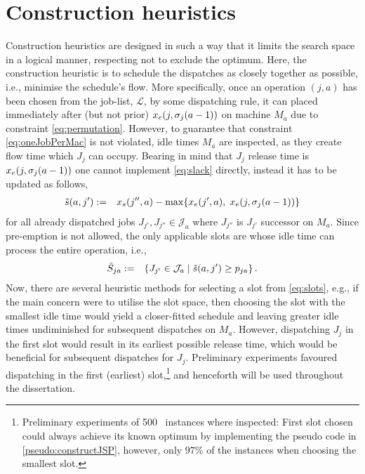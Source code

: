\section{Construction heuristics}\label{sec:CH}
Construction heuristics are designed in such a way that it limits the search space in a logical manner, respecting not to exclude the optimum. Here, the construction heuristic is to schedule the dispatches as closely together as possible, i.e., minimise the schedule's flow. 
More specifically, once an operation $(j,a)$ has been chosen from the job-list, 
$\mathcal{L}$, by some dispatching rule, it can placed immediately after (but 
not prior) $x_e(j,{\mathbf{\sigma}}_j(a-1))$ on machine $M_a$ due to constraint 
\cref{eq:permutation}. 
However, to guarantee that constraint \cref{eq:oneJobPerMac} is not violated, 
idle times $M_a$ are inspected, as they create flow time  which $J_j$ can 
occupy. Bearing in mind that $J_j$ release time is $x_e(j,{\mathbf{\sigma}}_j(a-1))$ one 
cannot implement \cref{eq:slack} directly, instead it has to be updated as 
follows,
\begin{eqnarray}
	\tilde{s}(a,j')&:=& x_s(j'',a)-\max\{x_e(j',a),\;x_e(j,\vsigma_j(a-1))\} %
\end{eqnarray}
for all already dispatched jobs $J_{j'},J_{j''}\in \mathcal{J}_a$ where $J_{j''}$ is $J_{j'}$ successor on $M_a$. Since pre-emption is not allowed, the only applicable slots are whose idle time can process the entire operation, i.e.,
\begin{eqnarray}
	\tilde{S}_{ja}&:=&\condset{J_{j'}\in \mathcal{J}_a}{\tilde{s}(a,j')\geq 
	p_{ja} }\label{eq:slots}.
\end{eqnarray} 
Now, there are several heuristic methods for selecting a slot from 
\cref{eq:slots}, e.g., if the main concern were to utilise the slot space, then 
choosing the slot with the smallest idle time would yield a closer-fitted 
schedule and leaving greater idle times undiminished for subsequent dispatches 
on $M_a$. However, dispatching $J_j$ in the first slot would result in its 
earliest possible release time, which would be beneficial for subsequent 
dispatches for $J_j$. Preliminary experiments favoured dispatching in the first 
(earliest) slot,\footnote{Preliminary experiments of 500 \JSP\ instances where 
inspected: First slot chosen could always achieve its known optimum by 
implementing the pseudo code in \cref{pseudo:constructJSP}, however, only 
$97\%$ of the instances when choosing the smallest slot.} and henceforth will 
be used throughout the dissertation.

